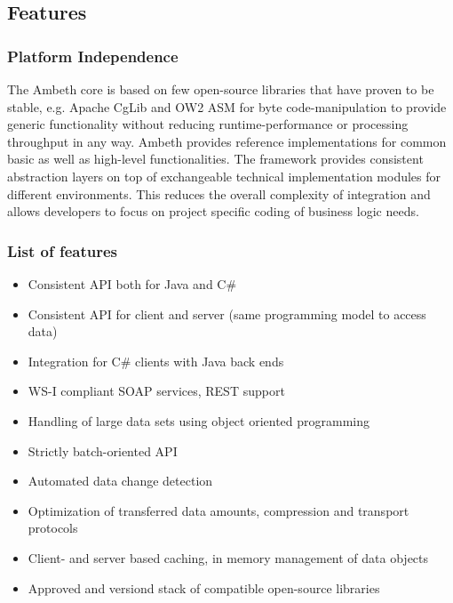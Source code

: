 \subsection{Features}
\subsubsection{Platform Independence}

The Ambeth core is based on few open-source libraries that have proven to be stable, e.g. Apache CgLib and OW2 ASM for byte code-manipulation to provide generic functionality without reducing runtime-performance or processing throughput in any way. Ambeth provides reference implementations for common basic as well as high-level functionalities. The framework provides consistent abstraction layers on top of exchangeable technical implementation modules for different environments. This reduces the overall complexity of integration and allows developers to focus on project specific coding of  business logic needs.

\subsubsection{List of features}

\begin{itemize}
	\item Consistent API both for Java and C\#
	\item Consistent API for client and server (same programming model to access data)
	\item Integration for C\# clients with Java back ends
	\item WS-I compliant SOAP services, REST support
	\item Handling of large data sets using object oriented programming
	\item Strictly batch-oriented API
	\item Automated data change detection
	\item Optimization of transferred data amounts, compression and transport protocols
	\item Client- and server based caching, in memory management of data objects
	\item Approved and versiond stack of compatible open-source libraries
\end{itemize}


